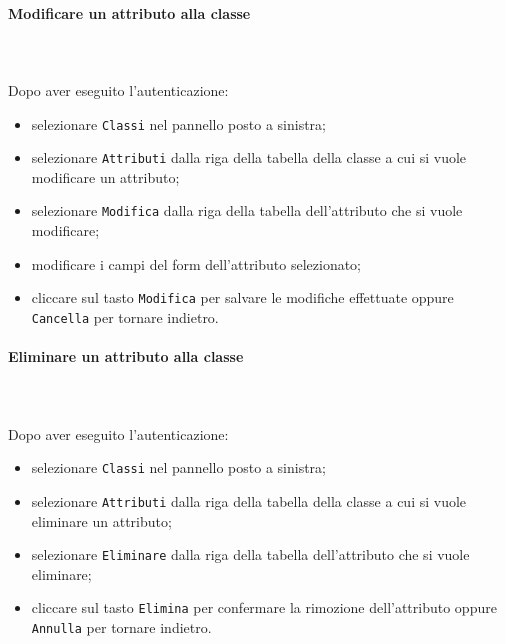 	\paragraph{Modificare un attributo alla classe} \mbox{}\\ \mbox{}\\
	Dopo aver eseguito l'autenticazione:
	\begin{itemize}
		\item selezionare \texttt{Classi} nel pannello posto a sinistra;
		\item selezionare \texttt{Attributi} dalla riga della tabella della classe
		a cui si vuole modificare un attributo;\
		\item selezionare \texttt{Modifica} dalla riga della tabella dell'attributo
		che si vuole modificare;
		\item modificare i campi del form dell'attributo selezionato;
		\item cliccare sul tasto \texttt{Modifica} per salvare le modifiche effettuate
		oppure \texttt{Cancella} per tornare indietro.
	\end{itemize}
	
	\paragraph{Eliminare un attributo alla classe} \mbox{}\\ \mbox{}\\
	Dopo aver eseguito l'autenticazione:
	\begin{itemize}
		\item selezionare \texttt{Classi} nel pannello posto a sinistra;
		\item selezionare \texttt{Attributi} dalla riga della tabella della classe
		a cui si vuole eliminare un attributo;\
		\item selezionare \texttt{Eliminare} dalla riga della tabella dell'attributo 
		che si vuole eliminare;
		\item cliccare sul tasto \texttt{Elimina} per confermare la rimozione dell'attributo
		oppure \texttt{Annulla} per tornare indietro.
	\end{itemize}
	
